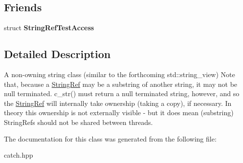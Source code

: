\subsection*{Friends}
\begin{DoxyCompactItemize}
\item 
struct {\bfseries String\+Ref\+Test\+Access}\hypertarget{classCatch_1_1StringRef_a420e64e1652de1b0d427775781b018f5}{}\label{classCatch_1_1StringRef_a420e64e1652de1b0d427775781b018f5}

\end{DoxyCompactItemize}


\subsection{Detailed Description}
A non-\/owning string class (similar to the forthcoming std\+::string\+\_\+view) Note that, because a \hyperlink{classCatch_1_1StringRef}{String\+Ref} may be a substring of another string, it may not be null terminated. c\+\_\+str() must return a null terminated string, however, and so the \hyperlink{classCatch_1_1StringRef}{String\+Ref} will internally take ownership (taking a copy), if necessary. In theory this ownership is not externally visible -\/ but it does mean (substring) String\+Refs should not be shared between threads. 

The documentation for this class was generated from the following file\+:\begin{DoxyCompactItemize}
\item 
catch.\+hpp\end{DoxyCompactItemize}
